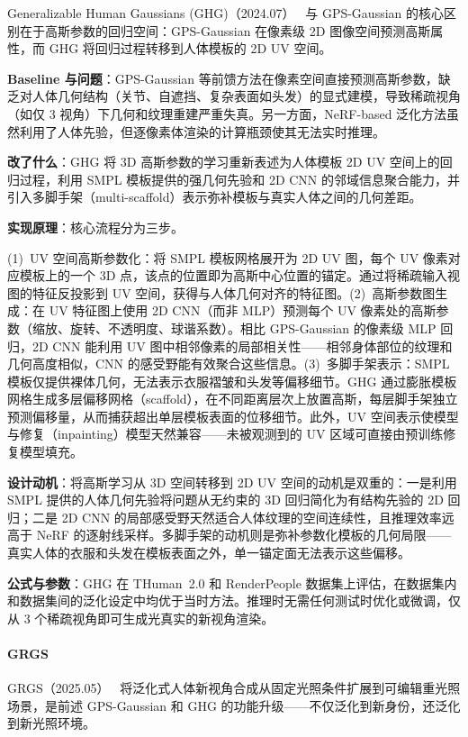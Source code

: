 Generalizable Human Gaussians (GHG)（2024.07）~\cite{2407_12777} 与 GPS-Gaussian 的核心区别在于高斯参数的回归空间：GPS-Gaussian 在像素级 2D 图像空间预测高斯属性，而 GHG 将回归过程转移到人体模板的 2D UV 空间。

\textbf{Baseline 与问题}：GPS-Gaussian 等前馈方法在像素空间直接预测高斯参数，缺乏对人体几何结构（关节、自遮挡、复杂表面如头发）的显式建模，导致稀疏视角（如仅 3 视角）下几何和纹理重建严重失真。另一方面，NeRF-based 泛化方法虽然利用了人体先验，但逐像素体渲染的计算瓶颈使其无法实时推理。

\textbf{改了什么}：GHG 将 3D 高斯参数的学习重新表述为人体模板 2D UV 空间上的回归过程，利用 SMPL 模板提供的强几何先验和 2D CNN 的邻域信息聚合能力，并引入多脚手架（multi-scaffold）表示弥补模板与真实人体之间的几何差距。

\textbf{实现原理}：核心流程分为三步。

(1)~UV 空间高斯参数化：将 SMPL 模板网格展开为 2D UV 图，每个 UV 像素对应模板上的一个 3D 点，该点的位置即为高斯中心位置的锚定。通过将稀疏输入视图的特征反投影到 UV 空间，获得与人体几何对齐的特征图。(2)~高斯参数图生成：在 UV 特征图上使用 2D CNN（而非 MLP）预测每个 UV 像素处的高斯参数（缩放、旋转、不透明度、球谐系数）。相比 GPS-Gaussian 的像素级 MLP 回归，2D CNN 能利用 UV 图中相邻像素的局部相关性——相邻身体部位的纹理和几何高度相似，CNN 的感受野能有效聚合这些信息。(3)~多脚手架表示：SMPL 模板仅提供裸体几何，无法表示衣服褶皱和头发等偏移细节。GHG 通过膨胀模板网格生成多层偏移网格（scaffold），在不同距离层次上放置高斯，每层脚手架独立预测偏移量，从而捕获超出单层模板表面的位移细节。此外，UV 空间表示使模型与修复（inpainting）模型天然兼容——未被观测到的 UV 区域可直接由预训练修复模型填充。

\textbf{设计动机}：将高斯学习从 3D 空间转移到 2D UV 空间的动机是双重的：一是利用 SMPL 提供的人体几何先验将问题从无约束的 3D 回归简化为有结构先验的 2D 回归；二是 2D CNN 的局部感受野天然适合人体纹理的空间连续性，且推理效率远高于 NeRF 的逐射线采样。多脚手架的动机则是弥补参数化模板的几何局限——真实人体的衣服和头发在模板表面之外，单一锚定面无法表示这些偏移。

\textbf{公式与参数}：GHG 在 THuman~2.0 和 RenderPeople 数据集上评估，在数据集内和数据集间的泛化设定中均优于当时方法。推理时无需任何测试时优化或微调，仅从 3 个稀疏视角即可生成光真实的新视角渲染。

\paragraph{GRGS}

GRGS（2025.05）~\cite{2505_21502} 将泛化式人体新视角合成从固定光照条件扩展到可编辑重光照场景，是前述 GPS-Gaussian 和 GHG 的功能升级——不仅泛化到新身份，还泛化到新光照环境。

